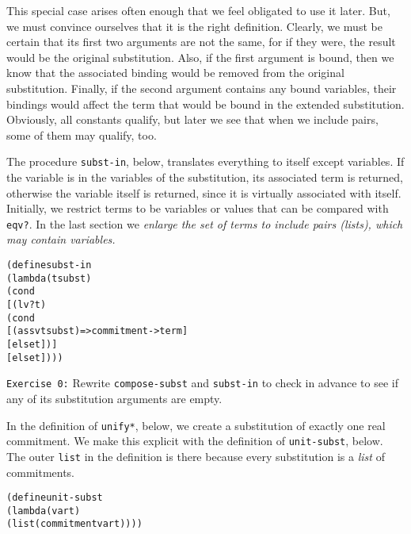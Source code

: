 This special case arises often enough that we feel obligated to use
it later.  But, we must convince ourselves that it is the right
definition.  Clearly, we must be certain that its first two arguments
are not the same, for if they were, the result would be the original
substitution.  Also, if the first argument is bound, then we know that
the associated binding would be removed from the original
substitution.  Finally, if the second argument contains any bound
variables, their bindings would affect the term that would be bound in
the extended substitution.  Obviously, all constants qualify, but later
we see that when we include pairs, some of them may qualify, too.

The procedure \texttt{subst-in}, below, translates everything to
itself except variables.  If the variable is in the variables of the
substitution, its associated term is returned, otherwise the variable
itself is returned, since it is virtually associated with
itself. Initially, we restrict terms to be variables or values that
can be compared with \texttt{eqv?}.  In the last section we
\emph{enlarge the set of terms to include pairs (lists), which may
contain variables.}

\begin{alltt}
(define subst-in
  (lambda (t subst)
    (cond
      [(lv? t)
       (cond
         [(assv t subst) => commitment->term]
         [else t])]
      [else t])))
\end{alltt}

\texttt{Exercise 0:} Rewrite \texttt{compose-subst} and
\texttt{subst-in} to check in advance to see if any of
its substitution arguments are empty.

In the definition of \texttt{unify*}, below, we create a
substitution of exactly one real commitment. We make this explicit
with the definition of \texttt{unit-subst}, below. The outer
\texttt{list} in the definition is there because every substitution is a
\emph{list} of commitments.  

\begin{alltt}
(define unit-subst 
  (lambda (var t)
    (list (commitment var t))))
\end{alltt}

